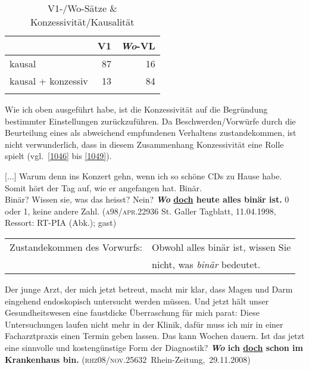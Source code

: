 \begin{table}
	\caption{\label{tab:1045}V1-/Wo-Sätze \& Konzessivität/Kausalität}
    \begin{tabular}[t]{lrr}
    \lsptoprule
	& V1 & \textit{Wo}-VL\\
	\midrule
	kausal & 87 & 16\\
	kausal + konzessiv & 13 & 84\\
	\lspbottomrule
    \end{tabular}   
\end{table}
Wie ich oben ausgeführt habe, ist die Konzessivität auf die Begründung bestimmter Einstellungen zurückzuführen. Da Beschwerden/Vorwürfe durch die Beurteilung eines als abweichend empfundenen Verhaltens zustandekommen, ist nicht verwunderlich, dass in diesem Zusammenhang Konzessivität eine Rolle spielt (vgl.\ \ref{1046} bis \ref{1049}).

\begin{exe}
	\ex\label{1046} 

	[...] Warum denn ins Konzert gehn, wenn ich so schöne CDs zu Hause habe. Somit hört der Tag auf, wie er angefangen hat. Binär.\\
	Binär? Wissen sie, was das heisst? Nein? \textbf{\textit{Wo} \ul{doch} heute alles binär ist.} 0 oder 1, keine andere Zahl.
	\newline              		
	(\textsc{a98/apr.22936} St. Galler Tagblatt, 11.04.1998, Ressort: \textsc{RT-PIA} (Abk.); gast)
\end{exe}
			                     
\begin{exe}
	\ex\label{1047} 
	\begin{tabular}[t]{@{}ll@{}}
	Zustandekommen des Vorwurfs: & Obwohl alles binär ist, wissen Sie \\
	& nicht, was \textit{binär} bedeutet.
	\end{tabular}
\end{exe}
	
\begin{exe}
	\ex\label{1048} 

	Der junge Arzt, der mich jetzt betreut, macht mir klar, dass Magen und Darm eingehend endoskopisch untersucht werden müssen. Und jetzt hält unser 			Gesundheitswesen eine faustdicke Überraschung für mich parat: Diese Untersuchungen laufen nicht mehr in der Klinik, dafür muss ich mir in einer 			Facharztpraxis einen Termin geben lassen. Das kann Wochen dauern. Ist das jetzt eine sinnvolle und kostengünstige Form der Diagnostik? 						\textbf{\textit{Wo} ich \ul{doch} schon im Krankenhaus bin.}
	\newline              		
	\hbox{}\hfill\hbox{(\textsc{rhz08/nov.25632} Rhein-Zeitung, 29.11.2008)}
\end{exe}	


